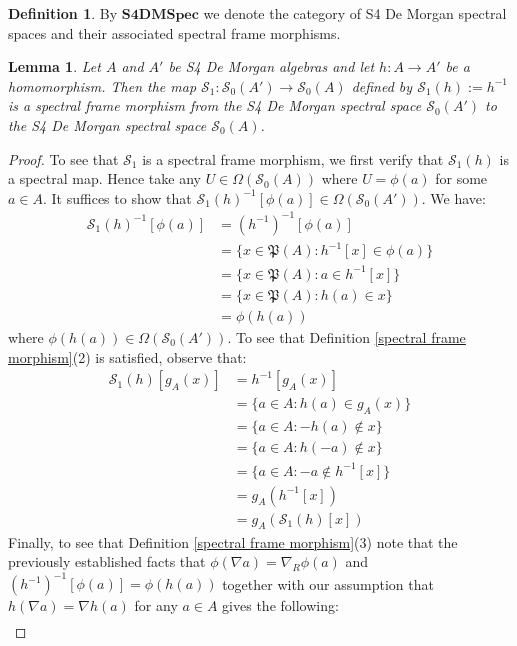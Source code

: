 \documentclass{amsart}
\theoremstyle{plain}
\newtheorem{lemma}[theorem]{Lemma}
\theoremstyle{definition}
\newtheorem{definition}[theorem]{Definition}
\begin{document}
\begin{definition}\label{category of spec spaces}
    By $\mathbf{S4DMSpec}$ we denote the category of S4 De Morgan spectral spaces and their associated spectral frame morphisms. 
\end{definition}
\begin{lemma}\label{homo to spec}
    Let $A$ and $A'$ be S4 De Morgan algebras and let $h\colon A\to A'$ be a homomorphism. Then the map $\mathcal{S}_1\colon\mathcal{S}_0(A')\to\mathcal{S}_0(A)$ defined by $\mathcal{S}_1(h):=h^{-1}$ is a spectral frame morphism from the S4 De Morgan spectral space $\mathcal{S}_0(A')$ to the S4 De Morgan spectral space $\mathcal{S}_0(A)$.  
\end{lemma}
\begin{proof}
To see that $\mathcal{S}_1$ is a spectral frame morphism, we first verify that $\mathcal{S}_1(h)$ is a spectral map. Hence take any $U\in\Omega(\mathcal{S}_0(A))$ where $U=\phi(a)$ for some $a\in A$. It suffices to show that $\mathcal{S}_1(h)^{-1}[\phi(a)]\in\Omega(\mathcal{S}_0(A'))$. We have: 
\begin{align*}
    \mathcal{S}_1(h)^{-1}[\phi(a)]&=(h^{-1})^{-1}[\phi(a)]\\&=\{x\in\mathfrak{P}(A):h^{-1}[x]\in\phi(a)\}
    \\&=\{x\in\mathfrak{P}(A):a\in h^{-1}[x]\}
    \\&=\{x\in\mathfrak{P}(A):h(a)\in x\}
    \\&=\phi(h(a))
\end{align*}
where $\phi(h(a))\in\Omega(\mathcal{S}_0(A'))$. To see that Definition \ref{spectral frame morphism}(2) is satisfied, observe that:  
\begin{align*}
    \mathcal{S}_1(h)[g_A(x)]&=h^{-1}[g_A(x)]\\&=\{a\in A:h(a)\in g_A(x)\}
    \\&=\{a\in A:-h(a)\not\in x\}
    \\&=\{a\in A:h(-a)\not\in x\}
    \\&=\{a\in A:-a\not\in h^{-1}[x]\}
    \\&=g_A(h^{-1}[x])
    \\&=g_A(\mathcal{S}_1(h)[x])
\end{align*}
Finally, to see that Definition \ref{spectral frame morphism}(3) note that the previously established facts that $\phi(\nabla a)=\nabla_R\phi(a)$ and $(h^{-1})^{-1}[\phi(a)]=\phi(h(a))$ together with our assumption that $h(\nabla a)=\nabla h(a)$ for any $a\in A$ gives the following: 
\begin{align*}

\end{align*}
\end{proof}
\end{document}
